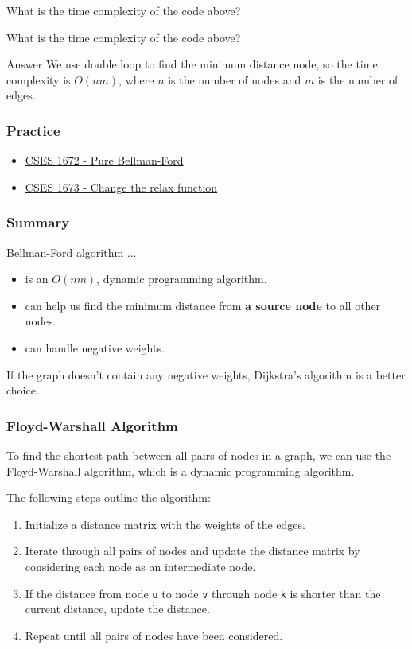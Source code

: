 \documentclass[xcolor=dvipsnames]{beamer}
\begin{document}
    \begin{frame}
        What is the time complexity of the code above?

    \end{frame}
    \begin{frame}
        What is the time complexity of the code above?
        \begin{block}{Answer}
            We use double loop to find the minimum distance node,
            so the time complexity is $O(nm)$, where $n$ is the number of nodes and $m$ is the number of edges.
        \end{block}
        
    \end{frame}
    \begin{frame}
        \frametitle{Practice}
        \begin{itemize}
            \item \href{https://cses.fi/problemset/task/1672}{CSES 1672 - Pure Bellman-Ford}
            \item \href{https://cses.fi/problemset/task/1673}{CSES 1673 - Change the relax function}
        \end{itemize}
    \end{frame}
    \begin{frame}
        \frametitle{Summary}
        Bellman-Ford algorithm ...
        \begin{itemize}
            \item is an $O(nm)$, dynamic programming algorithm.
            \item can help us find the minimum distance from \textbf{a source node} to all other nodes.
            \item can handle negative weights.
        \end{itemize}
        If the graph doesn't contain any negative weights, Dijkstra's algorithm is a better choice.
    \end{frame}

    \begin{frame}
        \frametitle{Floyd-Warshall Algorithm}
        To find the shortest path between all pairs of nodes in a graph,
        we can use the Floyd-Warshall algorithm, which is a dynamic programming algorithm.

      
        The following steps outline the algorithm:
        \begin{enumerate}
            \item Initialize a distance matrix with the weights of the edges.
            \item Iterate through all pairs of nodes and update the distance matrix by 
            considering each node as an intermediate node.
            \item If the distance from node \texttt{u} to node \texttt{v} through node 
            \texttt{k} is shorter than the current distance, update the distance.
            \item Repeat until all pairs of nodes have been considered.
        \end{enumerate}
        \vspace{0.5cm}
    \end{frame}
\end{document}
